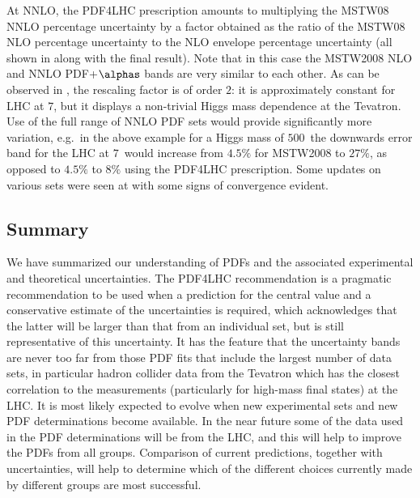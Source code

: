 
At NNLO, 
the PDF4LHC prescription amounts to multiplying the MSTW08 NNLO
percentage 
uncertainty by a factor obtained as the ratio of the MSTW08 NLO
percentage uncertainty to the
NLO envelope percentage uncertainty 
(all shown in  along with the final result).  
Note that in this case
the MSTW2008 NLO and NNLO
PDF+$\alphas$ bands are very similar to each other. 
As can be observed in ,
the rescaling factor is of order $2$: it is approximately constant for
LHC at $7$\UTeV, but it displays a non-trivial Higgs mass dependence
at the Tevatron. Use of the full range of NNLO PDF sets would provide 
significantly more variation, e.g.\ in the above example for a Higgs mass
of $500$\UGeV\ the downwards error band for the LHC at $7$\UTeV\ would increase 
from $4.5\%$ for MSTW2008 to $27\%$, as opposed to $4.5\%$ to $8\%$ using the 
PDF4LHC prescription. 
Some updates on various sets were seen at 
with some signs of convergence evident.   





\subsection{Summary}
\label{sec:summary}

We have summarized our understanding
of PDFs and the associated experimental and theoretical uncertainties.
The PDF4LHC recommendation is a pragmatic recommendation to be used when 
a prediction for the central value and a conservative estimate of the 
uncertainties is required, which acknowledges that the latter will be larger
than that from an individual set, but is still representative of this 
uncertainty. It has the feature that the uncertainty bands
are never too far from those PDF fits that include the largest number of 
data sets, in 
particular hadron collider data from the Tevatron which has the closest 
correlation to the measurements (particularly for high-mass final states) 
at the LHC. It is most likely expected to evolve when new experimental sets
and new PDF determinations become available.  In the near future 
some of the data used in the PDF determinations will be from the LHC, 
and this
will help to improve the PDFs from all groups. Comparison of current 
predictions, 
together with uncertainties, will help to determine which of the different choices
currently made by different groups are most successful. 

\clearpage
